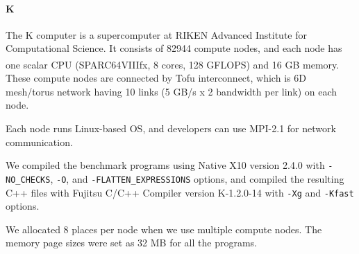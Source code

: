 \paragraph{K}
The K computer is a supercomputer at RIKEN 
Advanced Institute for Computational Science.
It consists of 82944 compute nodes, and 
each node has one scalar CPU (SPARC64\textsuperscript{\texttrademark}VIIIfx, 8 cores, 128 GFLOPS)
and 16 GB memory.
These compute nodes are connected by Tofu interconnect,
which is 6D mesh/torus network having 10 links (5 GB/s x 2 bandwidth per link) on each node.

Each node runs Linux-based OS, and developers can use MPI-2.1 for network communication.

We compiled the benchmark programs using Native X10 version 2.4.0
with \texttt{-NO\_CHECKS}, \texttt{-O}, and \texttt{-FLATTEN\_EXPRESSIONS} options,
and compiled the resulting C++ files with Fujitsu C/C++ Compiler version K-1.2.0-14 
with \texttt{-Xg} and \texttt{-Kfast} options. 

We allocated 8 places per node when we use multiple compute nodes.
The memory page sizes were set as 32 MB for all the programs.


